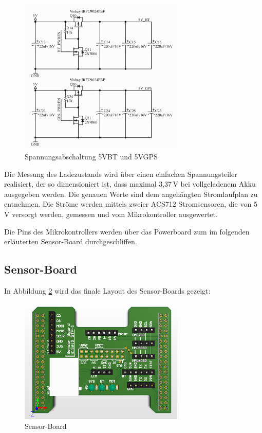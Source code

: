 \begin{figure}[H]
  \centering
  \includegraphics[width=0.7\textwidth]{./img/spannungsabschaltung.png}
  \caption{Spannungsabschaltung 5VBT und 5VGPS}\label{fig.spannungsabschaltung}
\end{figure}

Die Messung des Ladezustands wird über einen einfachen Spannungsteiler realisiert, der so dimensioniert ist, dass maximal 3,37\,V bei vollgeladenem Akku ausgegeben werden. Die genauen Werte sind dem angehängten Stromlaufplan zu entnehmen. Die Ströme werden mittels zweier ACS712 Stromsensoren, die von 5\,V versorgt werden, gemessen und vom Mikrokontroller ausgewertet.

Die Pins des Mikrokontrollers werden über das Powerboard zum im folgenden erläuterten Sensor-Board durchgeschliffen.

\pagebreak
\subsection{Sensor-Board}
In Abbildung \ref{fig.sensorboard} wird das finale Layout des Sensor-Boards gezeigt:

\begin{figure}[H]
  \centering
  \includegraphics[width=0.7\textwidth]{./img/PCB_Sensors_3D_top.png}
  \caption{Sensor-Board}\label{fig.sensorboard}
\end{figure}

